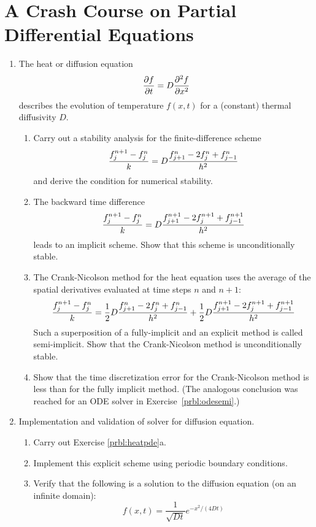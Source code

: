 \documentclass{article}
\begin{document}
\section{A Crash Course on Partial Differential Equations}
\begin{enumerate}
\item The heat or diffusion equation \label{prbl:heatpde} 
\[
{\partial f \over \partial t} = D {\partial^2 f\over\partial x^2}
\]
describes the evolution of temperature $f(x,t)$ for a (constant) thermal diffusivity $D$.
\begin{enumerate}\setlength{\itemsep}{0pt}
\item 
Carry out a stability analysis for the finite-difference scheme
\[
{ f^{n+1}_j - f^n_j \over k } = D { f^n_{j+1} - 2 f^n_j + f^n_{j-1} \over h^2 }
\]
and derive the condition for numerical stability.
\item
The backward time difference
\[
{ f^{n+1}_j - f^n_j \over k } = D { f^{n+1}_{j+1} - 2 f^{n+1}_j + f^{n+1}_{j-1} \over h^2 }
\]
leads to an implicit scheme.
Show that this scheme is unconditionally stable.

\item The Crank-Nicolson method for the heat equation uses the average of the spatial derivatives evaluated at time steps $n$ and $n+1$:
\[
{ f^{n+1}_j - f^n_j \over k } = 
\frac{1}{2} D { f^{n}_{j+1} - 2 f^{n}_j + f^{n}_{j-1} \over h^2 } + 
\frac{1}{2} D { f^{n+1}_{j+1} - 2 f^{n+1}_j + f^{n+1}_{j-1} \over h^2 }
\]
Such a superposition of a fully-implicit and an explicit method is called semi-implicit.
Show that the Crank-Nicolson method is unconditionally stable.

\item Show that the time discretization error for the Crank-Nicolson method is less than for the fully implicit method. (The analogous conclusion was reached for an ODE solver in Exercise~\ref{prbl:odesemi}.)
\end{enumerate}


\item Implementation and validation of solver for diffusion equation.
\begin{enumerate}\setlength{\itemsep}{0pt}
\item Carry out Exercise \ref{prbl:heatpde}a.
  
\item Implement this explicit scheme using periodic boundary conditions.

\item {}
  Verify that the following is a solution to the diffusion equation (on an infinite domain):
  \[
  f(x,t) = \frac{1}{\sqrt{Dt}} e^{-x^2/(4Dt)}
  \]
  

\end{enumerate}
\end{enumerate}
\end{document}
